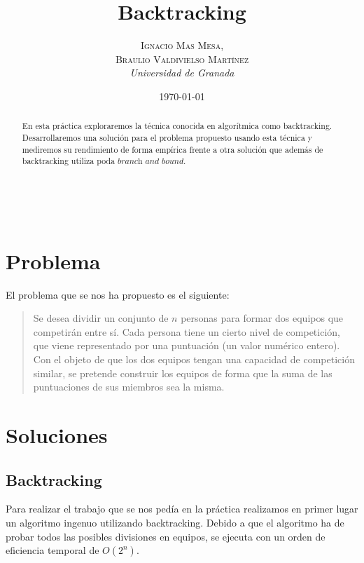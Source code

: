 \documentclass[a4paper, 11pt]{article}
\title{\textbf{Backtracking}\\ %
} %
\author{\textsc{Ignacio Mas Mesa,\\Braulio Valdivielso Martínez} %
\\{\textit{Universidad de Granada}}} %
\date{\today} %
\makeatletter
\renewcommand{\maketitle}{
  \begin{flushright} %
  
  {\LARGE\@title} %
  
  \vspace{50pt} %
  
  {\large\@author} %
  \\\@date %
  \vspace{40pt} %
  \end{flushright}
}
\makeatother
\begin{document}
\maketitle %

\renewcommand{\abstractname}{Abstract} %
\begin{abstract}
En esta práctica exploraremos la técnica conocida en algorítmica como backtracking. Desarrollaremos una solución para el problema propuesto usando esta técnica y mediremos su rendimiento de forma empírica frente a otra solución que además de backtracking utiliza poda \(\textit{branch and bound}\).
\end{abstract}

\vspace{30pt} %


  \tableofcontents

\pagebreak


\section{Problema}
El problema que se nos ha propuesto es el siguiente:
\begin{quote}
Se desea dividir un conjunto de $n$ personas para formar dos equipos que competirán entre sí.
Cada persona tiene un cierto nivel de competición, que viene representado por una puntuación
(un valor numérico entero). Con el objeto de que los dos equipos tengan una capacidad de
competición similar, se pretende construir los equipos de forma que la suma de las puntuaciones
de sus miembros sea la misma. 
\end{quote}

\section{Soluciones}
\subsection{Backtracking}
Para realizar el trabajo que se nos pedía en la práctica realizamos en primer lugar un algoritmo ingenuo utilizando backtracking. Debido a que el algoritmo ha de probar todos las posibles divisiones en equipos, se ejecuta con un orden de eficiencia temporal de $O(2^n)$. 
\end{document}
